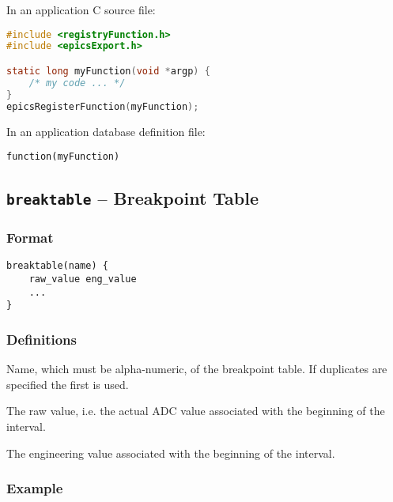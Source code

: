 In an application C source file:

\begin{lstlisting}[language=C]
#include <registryFunction.h>
#include <epicsExport.h>

static long myFunction(void *argp) {
    /* my code ... */
}
epicsRegisterFunction(myFunction);
\end{lstlisting}

In an application database definition file:

\begin{verbatim}
function(myFunction)
\end{verbatim}

\subsection{\texttt{breaktable} -- Breakpoint Table}

\subsubsection{Format}

\begin{verbatim}
breaktable(name) {
    raw_value eng_value
    ...
}
\end{verbatim}

\subsubsection{Definitions}

\begin{description}
\item [name] Name, which must be alpha-numeric, of the breakpoint table.
If duplicates are specified the first is used.

\item [raw\_value] The raw value, i.e. the actual ADC value associated with the beginning of the interval.

\item [eng\_value] The engineering value associated with the beginning of the interval.
\end{description}

\subsubsection{Example}

